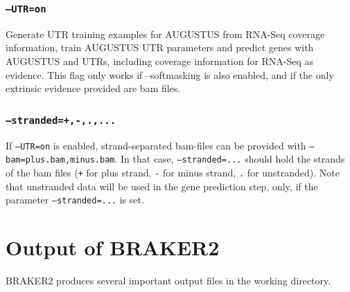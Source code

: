 \documentclass[]{article}
\begin{document}
\subsubsection{\texorpdfstring{\texttt{–UTR=on}}{--UTR=on}}\label{utron}

Generate UTR training examples for AUGUSTUS from RNA-Seq coverage
information, train AUGUSTUS UTR parameters and predict genes with
AUGUSTUS and UTRs, including coverage information for RNA-Seq as
evidence. This flag only works if --softmasking is also enabled, and if
the only extrinsic evidence provided are bam files.

\subsubsection{\texorpdfstring{\texttt{–stranded=+,-,.,...}}{--stranded=+,-,.,...}}\label{stranded-....}

If \texttt{–UTR=on} is enabled, strand-separated bam-files can be
provided with \texttt{–bam=plus.bam,minus.bam}. In that case,
\texttt{–stranded=...} should hold the strands of the bam files
(\texttt{+} for plus strand, \texttt{-} for minus strand, \texttt{.} for
unstranded). Note that unstranded data will be used in the gene
prediction step, only, if the parameter \texttt{–stranded=...} is set.

\section{Output of BRAKER2}\label{output-of-braker2}

BRAKER2 produces several important output files in the working
directory.
\end{document}
